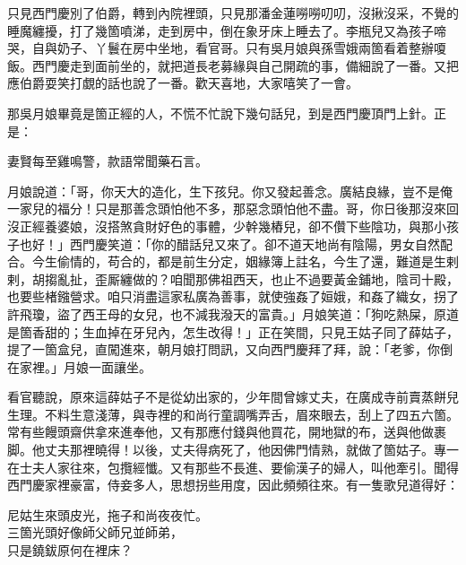 只見西門慶別了伯爵，轉到內院裡頭，只見那潘金蓮嘮嘮叨叨，沒揪沒采，不覺的睡魔纏擾，打了幾箇噴涕，走到房中，倒在象牙床上睡去了。李瓶兒又為孩子啼哭，自與奶子、丫鬟在房中坐地，看官哥。只有吳月娘與孫雪娥兩箇看着整辦嗄飯。西門慶走到面前坐的，就把道長老募緣與自己開疏的事，備細說了一番。又把應伯爵耍笑打覷的話也說了一番。歡天喜地，大家嘻笑了一會。

那吳月娘畢竟是箇正經的人，不慌不忙說下幾句話兒，到是西門慶頂門上針。正是：

\begin{myquote} 
妻賢每至雞鳴警，款語常聞藥石言。
\end{myquote} 

月娘說道：「哥，你天大的造化，生下孩兒。你又發起善念。廣結良緣，豈不是俺一家兒的福分！只是那善念頭怕他不多，那惡念頭怕他不盡。{}哥，你日後那沒來回沒正經養婆娘，沒搭煞貪財好色的事體，少幹幾樁兒，卻不儹下些陰功，與那小孩子也好！」西門慶笑道：「你的醋話兒又來了。卻不道天地尚有陰陽，男女自然配合。今生偷情的，苟合的，都是前生分定，姻緣簿上註名，今生了還，難道是生剌剌，胡搊亂扯，歪厮纏做的？{}咱聞那佛祖西天，也止不過要黃金鋪地，陰司十殿，也要些楮鏹營求。咱只消盡這家私廣為善事，就使強姦了姮娥，和姦了織女，拐了許飛瓊，盜了西王母的女兒，也不減我潑天的富貴。」{}月娘笑道：「狗吃熱屎，原道是箇香甜的；生血掉在牙兒內，怎生改得！」{}正在笑間，只見王姑子同了薛姑子，提了一箇盒兒，直闖進來，朝月娘打問訊，又向西門慶拜了拜，說：「老爹，你倒在家裡。」月娘一面讓坐。

看官聽說，原來這薛姑子不是從幼出家的，少年間曾嫁丈夫，在廣成寺前賣蒸餅兒生理。{}不料生意淺薄，與寺裡的和尚行童調嘴弄舌，眉來眼去，刮上了四五六箇。常有些饅頭齋供拿來進奉他，又有那應付錢與他買花，開地獄的布，送與他做裹脚。{}他丈夫那裡曉得！以後，丈夫得病死了，他因佛門情熟，就做了箇姑子。專一在士夫人家往來，包攬經懺。又有那些不長進、要偷漢子的婦人，叫他牽引。聞得西門慶家裡豪富，侍妾多人，思想拐些用度，因此頻頻往來。有一隻歌兒道得好：

\begin{myquote} 
尼姑生來頭皮光，拖子和尚夜夜忙。\\三箇光頭好像師父師兄並師弟，{}\\只是鐃鈸原何在裡床？{}
\end{myquote} 

